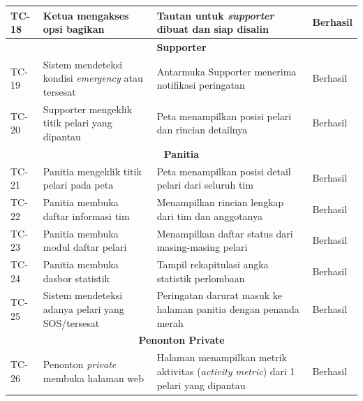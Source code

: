 \begin{longtable}{|p{1.2cm}|p{4.5cm}|p{5cm}|p{2cm}|}
TC-18 & Ketua mengakses opsi bagikan & Tautan untuk \textit{supporter} dibuat dan siap disalin & Berhasil \\ \hline


\multicolumn{4}{|c|}{\textbf{Supporter}} \\ \hline

TC-19 & Sistem mendeteksi kondisi \textit{emergency} atau tersesat & Antarmuka Supporter menerima notifikasi peringatan & Berhasil \\ \hline

TC-20 & Supporter mengeklik titik pelari yang dipantau & Peta menampilkan posisi pelari dan rincian detailnya & Berhasil \\ \hline


\multicolumn{4}{|c|}{\textbf{Panitia}} \\ \hline

TC-21 & Panitia mengeklik titik pelari pada peta & Peta menampilkan posisi detail pelari dari seluruh tim & Berhasil \\ \hline

TC-22 & Panitia membuka daftar informasi tim & Menampilkan rincian lengkap dari tim dan anggotanya & Berhasil \\ \hline

TC-23 & Panitia membuka modul daftar pelari & Menampilkan daftar status dari masing-masing pelari & Berhasil \\ \hline

TC-24 & Panitia membuka dasbor statistik & Tampil rekapitulasi angka statistik perlombaan & Berhasil \\ \hline

TC-25 & Sistem mendeteksi adanya pelari yang SOS/tersesat & Peringatan darurat masuk ke halaman panitia dengan penanda merah & Berhasil \\ \hline

\multicolumn{4}{|c|}{\textbf{Penonton Private}} \\ \hline
TC-26 & Penonton \textit{private} membuka halaman web & Halaman menampilkan metrik aktivitas (\textit{activity metric}) dari 1 pelari yang dipantau & Berhasil \\ \hline

\end{longtable}